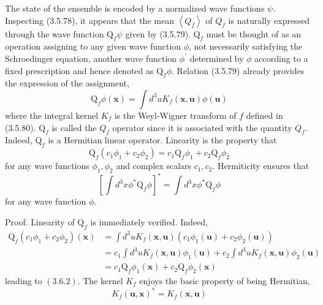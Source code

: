 \documentclass{article}
\begin{document}
The state of the ensemble is encoded by a normalized wave functions $\psi$.
Inspecting (3.5.78), it appears that the mean $\left\langle Q_{f}\right\rangle$ of $Q_{f}$ is naturally expressed through the wave function $\mathrm{Q}_{f} \psi$ given by (3.5.79). $\mathrm{Q}_{f}$ must be thought of as an operation assigning to any given wave function $\phi$, not necessarily satisfying the Schroedinger equation, another wave function $\phi^{\prime}$ determined by $\phi$ according to a fixed prescription and hence denoted as $\mathrm{Q}_{f} \phi$. Relation (3.5.79) already provides the expression of the assignment,
$$
\begin{equation*}
\mathrm{Q}_{f} \phi(\boldsymbol{x})=\int d^{3} u K_{f}(\boldsymbol{x}, \boldsymbol{u}) \phi(\boldsymbol{u}) \tag{3.6.1}
\end{equation*}
$$
where the integral kernel $K_{f}$ is the Weyl-Wigner transform of $f$ defined in (3.5.80). $\mathrm{Q}_{f}$ is called the $Q_{f}$ operator since it is associated with the quantity $Q_{f}$. Indeed, $\mathrm{Q}_{f}$ is a Hermitian linear operator. Linearity is the property that
$$
\begin{equation*}
\mathrm{Q}_{f}\left(c_{1} \phi_{1}+c_{2} \phi_{2}\right)=c_{1} \mathrm{Q}_{f} \phi_{1}+c_{2} \mathrm{Q}_{f} \phi_{2} \tag{3.6.2}
\end{equation*}
$$
for any wave functions $\phi_{1}, \phi_{2}$ and complex scalars $c_{1}, c_{2}$. Hermiticity ensures that
$$
\begin{equation*}
\left[\int d^{3} x \phi^{*} \mathrm{Q}_{f} \phi\right]^{*}=\int d^{3} x \phi^{*} \mathrm{Q}_{f} \phi \tag{3.6.3}
\end{equation*}
$$
for any wave function $\phi$.

Proof. Linearity of $\mathrm{Q}_{f}$ is immediately verified. Indeed,
$$
\begin{align*}
\mathrm{Q}_{f}\left(c_{1} \phi_{1}+c_{2} \phi_{2}\right)(\boldsymbol{x}) & =\int d^{3} u K_{f}(\boldsymbol{x}, \boldsymbol{u})\left(c_{1} \phi_{1}(\boldsymbol{u})+c_{2} \phi_{2}(\boldsymbol{u})\right)  \tag{3.6.4}\\
& =c_{1} \int d^{3} u K_{f}(\boldsymbol{x}, \boldsymbol{u}) \phi_{1}(\boldsymbol{u})+c_{2} \int d^{3} u K_{f}(\boldsymbol{x}, \boldsymbol{u}) \phi_{2}(\boldsymbol{u}) \\
& =c_{1} \mathrm{Q}_{f} \phi_{1}(\boldsymbol{x})+c_{2} \mathrm{Q}_{f} \phi_{2}(\boldsymbol{x})
\end{align*}
$$
leading to $(3.6 .2)$.
The kernel $K_{f}$ enjoys the basic property of being Hermitian,
$$
\begin{equation*}
K_{f}(\boldsymbol{u}, \boldsymbol{x})^{*}=K_{f}(\boldsymbol{x}, \boldsymbol{u}) \tag{3.6.5}
\end{equation*}
$$
\end{document}
